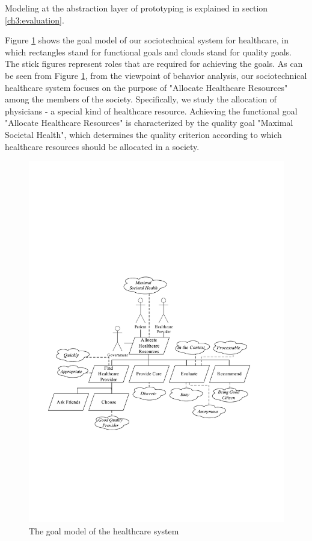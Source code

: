 Modeling at the abstraction layer of prototyping is explained in section \ref{ch3:evaluation}.

Figure \ref{ch3:fgoalmodel} shows the goal model of our sociotechnical system for healthcare, in which rectangles stand for functional goals and clouds stand for quality goals. The stick figures represent roles that are required for achieving the goals. As can be seen from Figure \ref{ch3:fgoalmodel}, from the viewpoint of behavior analysis, our sociotechnical healthcare system focuses on the purpose of "Allocate Healthcare Resources" among the members of the society. Specifically, we study the allocation of physicians - a special kind of healthcare resource. Achieving the functional goal "Allocate Healthcare Resources" is characterized by the quality goal "Maximal Societal Health", which determines the quality criterion according to which healthcare resources should be allocated in a society.

\begin{figure}
\centering
\includegraphics[scale=0.7]{chap3/chap3-fgoalmodel.pdf}
\caption{The goal model of the healthcare system}
\label{ch3:fgoalmodel}
\end{figure}

